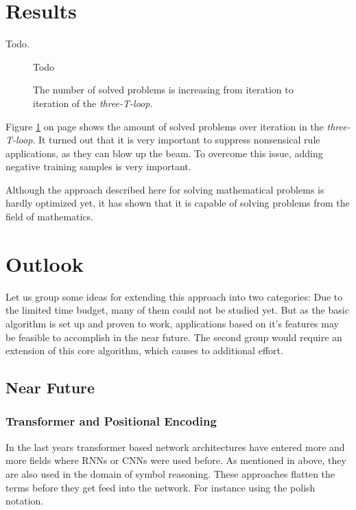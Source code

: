 \documentclass{scrartcl}
\theoremstyle{definition}
\begin{document}
\section{Results}

Todo.

\begin{figure}[!htbp]
	\centering
	Todo
	\caption{The number of solved problems is increasing from iteration to iteration of the \textit{three-T-loop}.}
	\label{fig:t3loop_performance}
\end{figure}

Figure \ref{fig:t3loop_performance} on page \pageref{fig:t3loop_performance} shows the amount of solved problems over iteration in the \textit{three-T-loop}. 
It turned out that it is very important to suppress nonsensical rule applications, as they can blow up the beam.
To overcome this issue, adding negative training samples is very important.

Although the approach described here for solving mathematical problems is hardly optimized yet,
it has shown that it is capable of solving problems from the field of mathematics.


\section{Outlook}

Let us group some ideas for extending this approach into two categories:
Due to the limited time budget, many of them could not be studied yet.
But as the basic algorithm is set up and proven to work, applications based on it's features may be feasible to accomplish in the near future.
The second group would require an extension of this core algorithm, which causes to additional effort.

\subsection{Near Future}

\subsubsection{Transformer and Positional Encoding}

In the last years transformer based network architectures have entered more and more fields where RNNs or CNNs were used before.
As mentioned in above, they are also used in the domain of symbol reasoning.
These approaches flatten the terms before they get feed into the network.
For instance using the polish notation.
\end{document}
